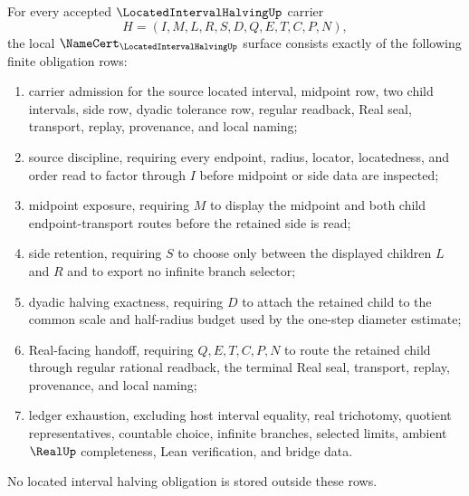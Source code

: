 \begin{theorem}
\label{thm:located-interval-halving-namecert-obligations}
For every accepted $\LocatedIntervalHalvingUp$ carrier
$$
H=(I,M,L,R,S,D,Q,E,T,C,P,N),
$$
the local $\NameCert_{\LocatedIntervalHalvingUp}$ surface consists exactly of the following finite obligation rows:
\begin{enumerate}
\item carrier admission for the source located interval, midpoint row, two child intervals, side row, dyadic tolerance row, regular readback, Real seal, transport, replay, provenance, and local naming;
\item source discipline, requiring every endpoint, radius, locator, locatedness, and order read to factor through $I$ before midpoint or side data are inspected;
\item midpoint exposure, requiring $M$ to display the midpoint and both child endpoint-transport routes before the retained side is read;
\item side retention, requiring $S$ to choose only between the displayed children $L$ and $R$ and to export no infinite branch selector;
\item dyadic halving exactness, requiring $D$ to attach the retained child to the common scale and half-radius budget used by the one-step diameter estimate;
\item Real-facing handoff, requiring $Q,E,T,C,P,N$ to route the retained child through regular rational readback, the terminal Real seal, transport, replay, provenance, and local naming;
\item ledger exhaustion, excluding host interval equality, real trichotomy, quotient representatives, countable choice, infinite branches, selected limits, ambient $\RealUp$ completeness, Lean verification, and bridge data.
\end{enumerate}
No located interval halving obligation is stored outside these rows.
\end{theorem}
